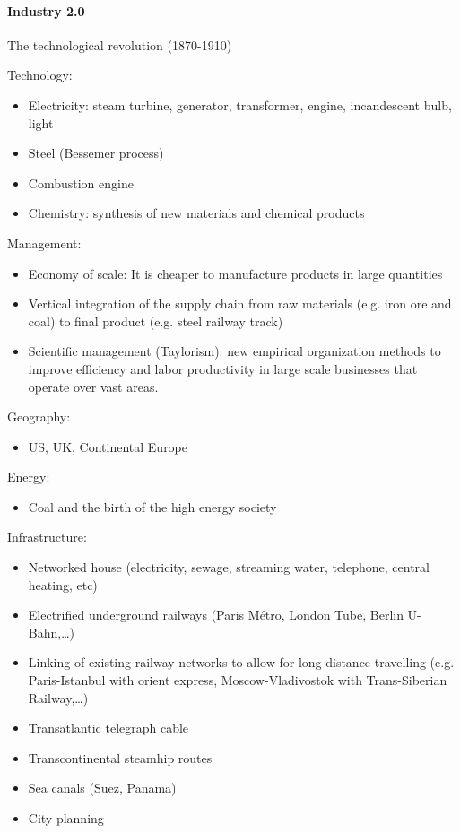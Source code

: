 \paragraph{Industry 2.0} The technological revolution (1870-1910)

Technology:
\begin{itemize}
    \item Electricity: steam turbine, generator, transformer, engine, incandescent
        bulb, light
    \item Steel (Bessemer process)
    \item Combustion engine
    \item Chemistry: synthesis of new materials and chemical products
\end{itemize}
Management:
\begin{itemize}
    \item Economy of scale: It is cheaper to manufacture products in large quantities
    \item Vertical integration of the supply chain from raw materials (e.g. iron
        ore and coal) to final product (e.g. steel railway track)
    \item Scientific management (Taylorism): new empirical organization methods
        to improve efficiency and labor productivity in large scale businesses
        that operate over vast areas.
\end{itemize}
Geography:
\begin{itemize}
    \item US, UK, Continental Europe
\end{itemize}
Energy:
\begin{itemize}
    \item Coal and the birth of the high energy society
\end{itemize}
Infrastructure:
\begin{itemize}
    \item Networked house (electricity, sewage, streaming water, telephone,
        central heating, etc)
    \item Electrified underground railways (Paris Métro, London Tube, Berlin U-Bahn,\dots)
    \item Linking of existing railway networks to allow for long-distance
        travelling (e.g. Paris-Istanbul with orient express, Moscow-Vladivostok
        with Trans-Siberian Railway,\dots)
    \item Transatlantic telegraph cable
    \item Transcontinental steamhip routes
    \item Sea canals (Suez, Panama)
    \item City planning
\end{itemize}

